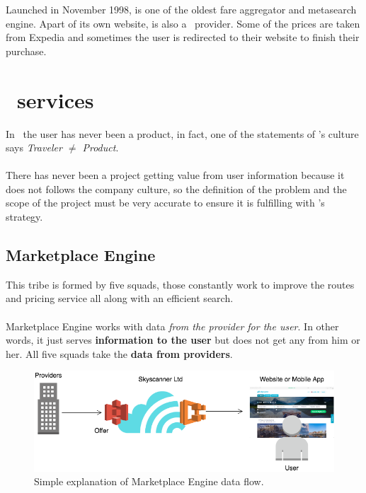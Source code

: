 Launched in November 1998, is one of the oldest fare aggregator and metasearch engine. Apart of its own website, is also a \company\ provider. Some of the prices are taken from Expedia\cite{expedia} and sometimes the user is redirected to their website to finish their purchase.


\section{\company\ services}

In \company\ the user has never been a product, in fact, one of the statements of \company's culture says \textit{Traveler $\neq$ Product}\cite{the_road_ahead}.
\\\\
There has never been a project getting value from user information because it does not follows the company culture, so the definition of the problem and the scope of the project must be very accurate to ensure it is fulfilling with \company's strategy\cite{skyscanner_strategy}.

\subsection{Marketplace Engine} \label{mp_engine}

This tribe is formed by five squads, those constantly work to improve the routes and pricing service all along with an efficient search.
\\\\
Marketplace Engine works with data \textit{from the provider for the user}. In other words, it just serves \textbf{information to the user} but does not get any from him or her. All five squads take the \textbf{data from providers}.

\begin{figure}[H]
\centering
\includegraphics[scale=0.45]{diagrams/state-of-the-art-tribes-marketplace-engine.png}
\caption{Simple explanation of Marketplace Engine data flow.}
\end{figure}

